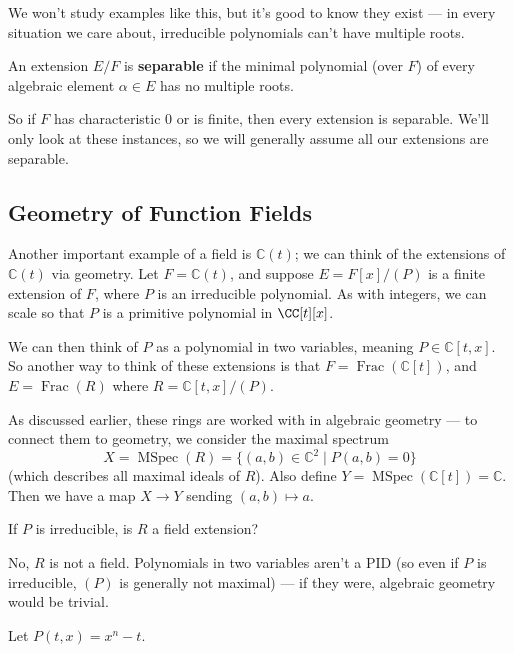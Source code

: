 We won't study examples like this, but it's good to know they exist --- in every situation we care about, irreducible polynomials can't have multiple roots.

\begin{definition}
    An extension $E/F$ is \textbf{separable} if the minimal polynomial (over $F$) of every algebraic element $\alpha \in E$ has no multiple roots. 
\end{definition}

So if $F$ has characteristic $0$ or is finite, then every extension is separable. We'll only look at these instances, so we will generally assume all our extensions are separable. 

\subsection{Geometry of Function Fields}

Another important example of a field is $\mathbb{C}(t)$; we can think of the extensions of $\mathbb{C}(t)$ via geometry. Let $F = \mathbb{C}(t)$, and suppose $E = F[x]/(P)$ is a finite extension of $F$, where $P$ is an irreducible polynomial. As with integers, we can scale so that $P$ is a primitive polynomial in $\CC[t][x]$. 

We can then think of $P$ as a polynomial in two variables, meaning $P \in \mathbb{C}[t, x]$. So another way to think of these extensions is that $F = \operatorname{Frac}(\mathbb{C}[t])$, and $E = \operatorname{Frac}(R)$ where $R = \mathbb{C}[t, x]/(P)$.

As discussed earlier, these rings are worked with in algebraic geometry --- to connect them to geometry, we consider the maximal spectrum \[X = \operatorname{MSpec}(R) = \{(a, b) \in \mathbb{C}^2 \mid P(a, b) = 0\}\] (which describes all maximal ideals of $R$). Also define $Y = \operatorname{MSpec}(\mathbb{C}[t]) = \mathbb{C}$. Then we have a map $X \to Y$ sending $(a, b) \mapsto a$. 

\begin{question}
    If $P$ is irreducible, is $R$ a field extension?
\end{question}

\begin{ans}
No, $R$ is not a field. Polynomials in two variables aren't a PID (so even if $P$ is irreducible, $(P)$ is generally not maximal) --- if they were, algebraic geometry would be trivial. 
\end{ans}

\begin{example}
    Let $P(t, x) = x^n - t$. 
\end{example}

